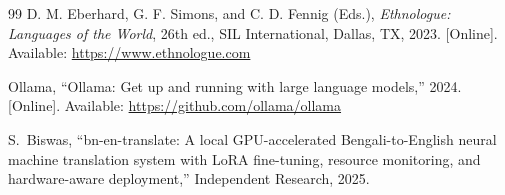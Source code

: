 \documentclass[conference]{IEEEtran}
\begin{document}
\begin{thebibliography}{99}
D. M. Eberhard, G. F. Simons, and C. D. Fennig (Eds.),
\textit{Ethnologue: Languages of the World}, 26th ed.,
SIL International, Dallas, TX, 2023.
[Online]. Available: \url{https://www.ethnologue.com}

Ollama, ``Ollama: Get up and running with large language models,'' 2024.
[Online]. Available: \url{https://github.com/ollama/ollama}

S.~Biswas,
``bn-en-translate: A local GPU-accelerated Bengali-to-English neural
machine translation system with LoRA fine-tuning, resource monitoring,
and hardware-aware deployment,''
Independent Research, 2025.

\end{thebibliography}
\end{document}
